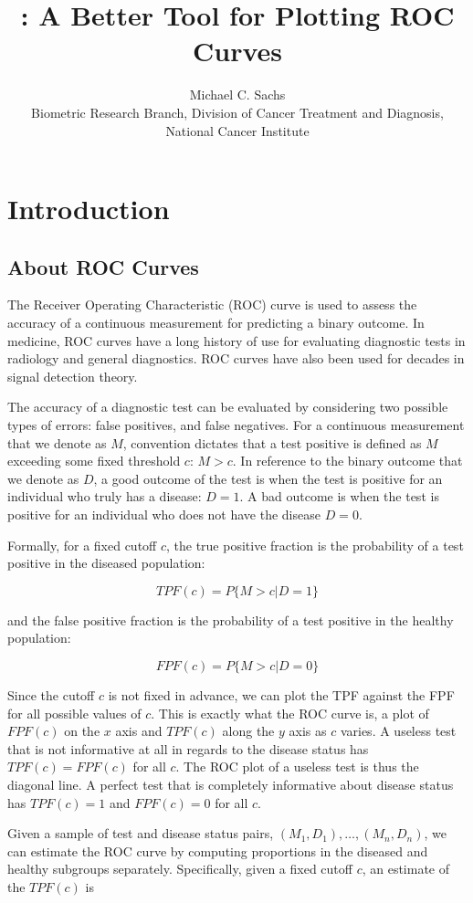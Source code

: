 \documentclass[article]{jss}
\author{		Michael C. Sachs\\Biometric Research Branch, Division of Cancer Treatment and Diagnosis,
National Cancer Institute		}
\title{\pkg{plotROC}: A Better Tool for Plotting ROC Curves}
\begin{document}
\section{Introduction}\label{introduction}

\subsection{About ROC Curves}\label{about-roc-curves}

The Receiver Operating Characteristic (ROC) curve is used to assess the
accuracy of a continuous measurement for predicting a binary outcome. In
medicine, ROC curves have a long history of use for evaluating
diagnostic tests in radiology and general diagnostics. ROC curves have
also been used for decades in signal detection theory.

The accuracy of a diagnostic test can be evaluated by considering two
possible types of errors: false positives, and false negatives. For a
continuous measurement that we denote as \(M\), convention dictates that
a test positive is defined as \(M\) exceeding some fixed threshold
\(c\): \(M > c\). In reference to the binary outcome that we denote as
\(D\), a good outcome of the test is when the test is positive for an
individual who truly has a disease: \(D = 1\). A bad outcome is when the
test is positive for an individual who does not have the disease
\(D = 0\).

Formally, for a fixed cutoff \(c\), the true positive fraction is the
probability of a test positive in the diseased population:

\[ TPF(c) = P\{ M > c | D = 1 \} \]

and the false positive fraction is the probability of a test positive in
the healthy population:

\[ FPF(c) = P\{ M > c | D = 0 \} \]

Since the cutoff \(c\) is not fixed in advance, we can plot the TPF
against the FPF for all possible values of \(c\). This is exactly what
the ROC curve is, a plot of \(FPF(c)\) on the \(x\) axis and \(TPF(c)\)
along the \(y\) axis as \(c\) varies. A useless test that is not
informative at all in regards to the disease status has
\(TPF(c) = FPF(c)\) for all \(c\). The ROC plot of a useless test is
thus the diagonal line. A perfect test that is completely informative
about disease status has \(TPF(c) = 1\) and \(FPF(c) = 0\) for all
\(c\).

Given a sample of test and disease status pairs,
\((M_1, D_1), \ldots, (M_n, D_n)\), we can estimate the ROC curve by
computing proportions in the diseased and healthy subgroups separately.
Specifically, given a fixed cutoff \(c\), an estimate of the \(TPF(c)\)
is
\end{document}
